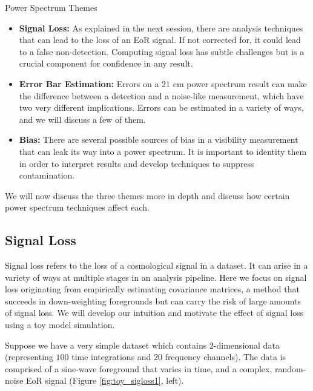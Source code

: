 \documentclass[preprint2,numberedappendix,tighten,twocolappendix]{aastex6}  %
\begin{document}
\begin{center}
Power Spectrum Themes
\end{center}
\begin{itemize}
\item \textbf{Signal Loss:} As explained in the next session, there are analysis techniques that can lead to the loss of an EoR signal. If not corrected for, it could lead to a false non-detection. Computing signal loss has subtle challenges but is a crucial component for confidence in any result.
\item \textbf{Error Bar Estimation:} Errors on a $21$ cm power spectrum result can make the difference between a detection and a noise-like measurement, which have two very different implications. Errors can be estimated in a variety of ways, and we will discuss a few of them.
\item \textbf{Bias:} There are several possible sources of bias in a visibility measurement that can leak its way into a power spectrum. It is important to identity them in order to interpret results and develop techniques to suppress contamination.
\end{itemize}

We will now discuss the three themes more in depth and discuss how certain power spectrum techniques affect each.

\subsection{Signal Loss}
\label{sec:SiglossOverview}

Signal loss refers to the loss of a cosmological signal in a dataset. It can arise in a variety of ways at multiple stages in an analysis pipeline. Here we focus on signal loss originating from empirically estimating covariance matrices, a method that succeeds in down-weighting foregrounds but can carry the risk of large amounts of signal loss. We will develop our intuition and motivate the effect of signal loss using a toy model simulation.

Suppose we have a very simple dataset which contains 2-dimensional data (representing $100$ time integrations and $20$ frequency channels). The data is comprised of a sine-wave foreground that varies in time, and a complex, random-noise EoR signal (Figure \ref{fig:toy_sigloss1}, left). 
\end{document}
